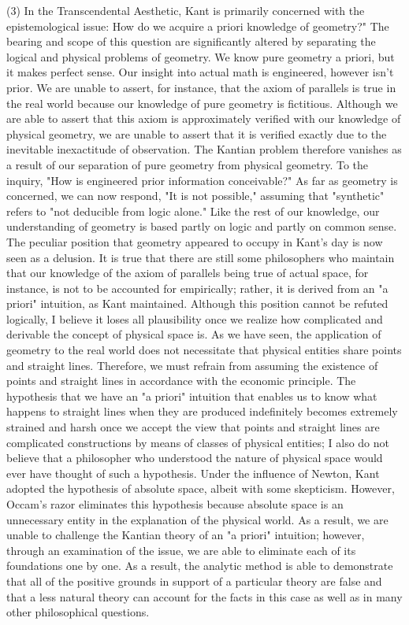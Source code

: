 \documentclass[a4paper,12pt]{book}[2004/02/16]
\theoremstyle{ilemma}
\theoremstyle{itheorem}
\theoremstyle{iother}
\theoremstyle{icorollary}
\theoremstyle{numcorollary}
\theoremstyle{idefinition}
\begin{document}
(3) In the Transcendental Aesthetic, Kant is primarily concerned with the epistemological issue: How do we acquire a priori knowledge of geometry?" The bearing and scope of this question are significantly altered by separating the logical and physical problems of geometry. We know pure geometry a priori, but it makes perfect sense. Our insight into actual math
is engineered, however isn't prior. We are unable to assert, for instance, that the axiom of parallels is true in the real world because our knowledge of pure geometry is fictitious. Although we are able to assert that this axiom is approximately verified with our knowledge of physical geometry, we are unable to assert that it is verified exactly due to the inevitable inexactitude of observation. The Kantian problem therefore vanishes as a result of our separation of pure geometry from physical geometry.
To the inquiry, "How is engineered prior information conceivable?" As far as geometry is concerned, we can now respond, "It is not possible," assuming that "synthetic" refers to "not deducible from logic alone." Like the rest of our knowledge, our understanding of geometry is based partly on logic and partly on common sense. The peculiar position that geometry appeared to occupy in Kant's day is now seen as a delusion. It is true that there are still some philosophers who maintain that our knowledge of the axiom of parallels being true of actual space, for instance, is not to be accounted for empirically; rather, it is derived from an "a priori" intuition, as Kant maintained. Although this position cannot be refuted logically, I believe it loses all plausibility once we realize how complicated and derivable the concept of physical space is. As we have seen, the application of geometry to the real world does not necessitate that physical entities share points and straight lines. Therefore, we must refrain from assuming the existence of points and straight lines in accordance with the economic principle. The hypothesis that we have an "a priori" intuition that enables us to know what happens to straight lines when they are produced indefinitely becomes extremely strained and harsh once we accept the view that points and straight lines are complicated constructions by means of classes of physical entities; I also do not believe that a philosopher who understood the nature of physical space would ever have thought of such a hypothesis. Under the influence of Newton, Kant adopted the hypothesis of absolute space, albeit with some skepticism. However, Occam's razor eliminates this hypothesis because absolute space is an unnecessary entity in the explanation of the physical world. As a result, we are unable to challenge the Kantian theory of an "a priori" intuition; however, through an examination of the issue, we are able to eliminate each of its foundations one by one. As a result, the analytic method is able to demonstrate that all of the positive grounds in support of a particular theory are false and that a less natural theory can account for the facts in this case as well as in many other philosophical questions.
\end{document}
